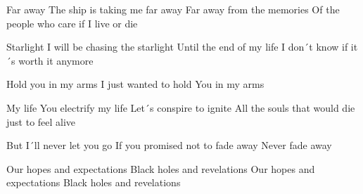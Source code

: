 Far away
The ship is taking me far away
Far away from the memories
Of the people who care if I live or die

Starlight
I will be chasing the starlight
Until the end of my life
I don´t know if it´s worth it anymore

Hold you in my arms
I just wanted to hold
You in my arms

My life
You electrify my life
Let´s conspire to ignite
All the souls that would die just to feel alive

But I´ll never let you go
If you promised not to fade away
Never fade away

Our hopes and expectations
Black holes and revelations
Our hopes and expectations
Black holes and revelations 

